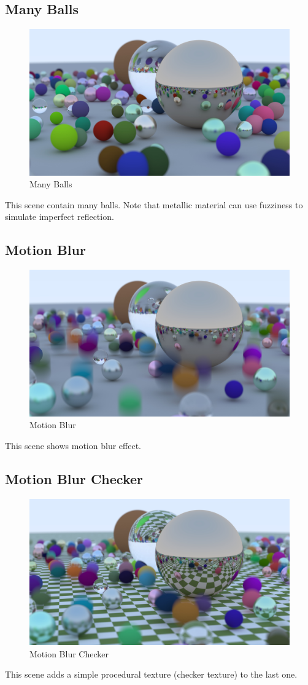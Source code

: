 \documentclass[utf8]{article}
\begin{document}
\subsection{Many Balls}
\begin{figure}[H]
	\centering
	\includegraphics[width=0.7\linewidth]{../_results/many_balls}
	\caption{Many Balls}
	\label{fig:manyballs}
\end{figure}
This scene contain many balls. Note that metallic material can use fuzziness to simulate imperfect reflection.

\subsection{Motion Blur}
\begin{figure}[H]
	\centering
	\includegraphics[width=0.7\linewidth]{../_results/motion_blur}
	\caption{Motion Blur}
	\label{fig:motionblur}
\end{figure}
This scene shows motion blur effect.

\subsection{Motion Blur Checker}
\begin{figure}[H]
	\centering
	\includegraphics[width=0.7\linewidth]{../_results/motion_blur_checker}
	\caption{Motion Blur Checker}
	\label{fig:motionblurchecker}
\end{figure}
This scene adds a simple procedural texture (checker texture) to the last one.
\end{document}
